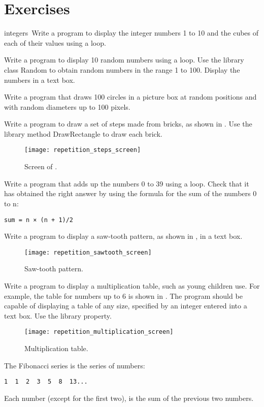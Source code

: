 	\section{Exercises}
		\begin{EXE}
			\item	{} integers Write a program to display the integer numbers 1 to 10 and the cubes of each of their values using a loop.
			\item	{} Write a program to display 10 random numbers using a loop. Use the library class Random to obtain random numbers in the range 1 to 100. Display the numbers in a text box.
			\item	{} Write a program that draws 100 circles in a picture box at random positions and with random diameters up to 100 pixels.
			\item	{} Write a program to draw a set of steps made from bricks, as shown in . Use the library method DrawRectangle to draw each brick.
				\begin{figure}[bth]
					\centering
					\texttt{[image: repetition\_steps\_screen]}
					\caption{Screen of .}
					\label{fig:repetition_steps_screen}
				\end{figure}
			\item	{} Write a program that adds up the numbers 0 to 39 using a loop. Check that it has obtained the right answer by using the formula for the sum of the numbers 0 to n:
				\begin{lstlisting}
sum = n × (n + 1)/2
				\end{lstlisting}
			\item	{} Write a program to display a saw-tooth pattern, as shown in , in a text box.
				\begin{figure}[bth]
					\centering
					\texttt{[image: repetition\_sawtooth\_screen]}
					\caption{Saw-tooth pattern.}
					\label{fig:repetition_sawtooth_screen}
				\end{figure}
			\item	{} Write a program to display a multiplication table, such as young children use. For example, the table for numbers up to 6 is shown in .
				The program should be capable of displaying a table of any size, specified by an integer entered into a text box. Use the library  property.
				\begin{figure}[bth]
					\centering
					\texttt{[image: repetition\_multiplication\_screen]}
					\caption{Multiplication table.}
					\label{fig:repetition_multiplication_screen}
				\end{figure}
			\item	{} The Fibonacci series is the series of numbers:
				\begin{lstlisting}
1  1  2  3  5  8  13...
				\end{lstlisting}
				Each number (except for the first two), is the sum of the previous two numbers. 
				

\end{EXE}
